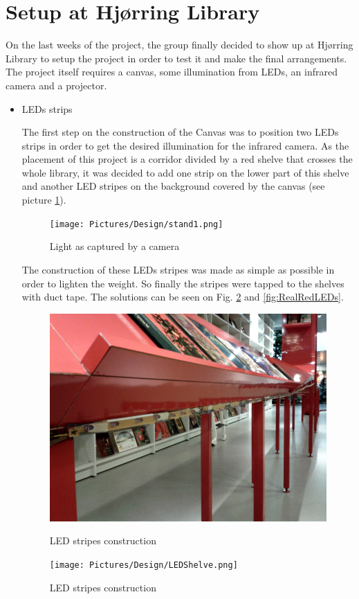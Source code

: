 \section{Setup at Hj{\o}rring Library}

On the last weeks of the project, the group finally decided to show up at Hj{\o}rring Library to setup the project in order to test it and make the final arrangements. The project itself requires a canvas, some illumination from LEDs, an infrared camera and a projector.

\begin{itemize}
\item LEDs strips

The first step on the construction of the Canvas was to position two LEDs strips in order to get the desired illumination for the infrared camera. As the placement of this project is a corridor divided by a red shelve that crosses the whole library, it was decided to add one strip on the lower part of this shelve and another LED stripes on the background covered by the canvas (see picture \ref{fig:LEDsPosition}).

\begin{figure}[htbp] 
\centering 
\texttt{[image: Pictures/Design/stand1.png]} 
\caption{Light as captured by a camera} 
\label{fig:LEDsPosition} 
\end{figure}

The construction of these LEDs stripes was made as simple as possible in order to lighten the weight. So finally the stripes were tapped to the shelves with duct tape. The solutions can be seen on Fig. \ref{fig:RealLEDs} and \ref{fig:RealRedLEDs}.

\begin{figure}[htbp] \centering
\begin{minipage}[b]{0.45\textwidth} \centering
\includegraphics[width=1.00\textwidth]{Pictures/Design/LEDRedShelve.png}
\caption{LED stripes construction}
\label{fig:RealRedLEDs}
\end{minipage} \hfill
\begin{minipage}[b]{0.45\textwidth} \centering
\texttt{[image: Pictures/Design/LEDShelve.png]} 
\caption{LED stripes construction}
\label{fig:RealLEDs}
\end{minipage} \hfill
\end{figure}


\end{itemize}
